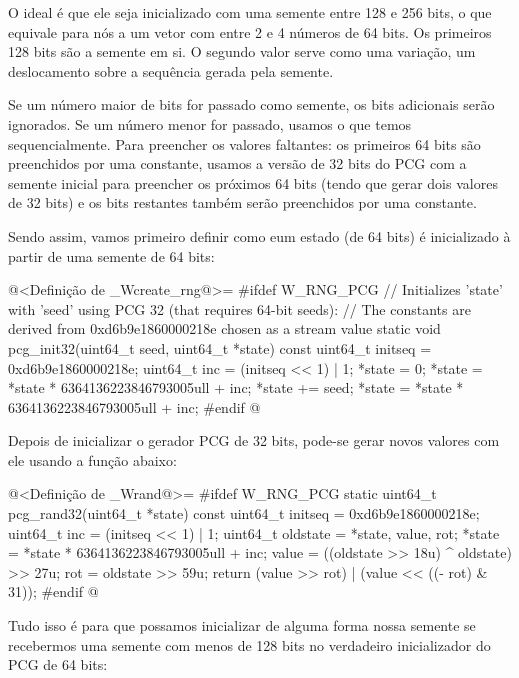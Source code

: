 O ideal é que ele seja inicializado com uma semente entre 128 e 256
bits, o que equivale para nós a um vetor com entre 2 e 4 números de 64
bits. Os primeiros 128 bits são a semente em si. O segundo valor serve
como uma variação, um deslocamento sobre a sequência gerada pela
semente.

Se um número maior de bits for passado como semente, os bits
adicionais serão ignorados. Se um número menor for passado, usamos o
que temos sequencialmente. Para preencher os valores faltantes: os
primeiros 64 bits são preenchidos por uma constante, usamos a versão
de 32 bits do PCG com a semente inicial para preencher os próximos 64
bits (tendo que gerar dois valores de 32 bits) e os bits restantes
também serão preenchidos por uma constante.

Sendo assim, vamos primeiro definir como eum estado (de 64 bits) é
inicializado à partir de uma semente de 64 bits:

\iniciocodigo
@<Definição de \_Wcreate\_rng@>=
#ifdef W_RNG_PCG
// Initializes 'state' with 'seed' using PCG 32 (that requires 64-bit seeds):
// The constants are derived from 0xd6b9e1860000218e chosen as a stream value
static void pcg_init32(uint64_t seed, uint64_t *state){
  const uint64_t initseq = 0xd6b9e1860000218e;
  uint64_t inc = (initseq << 1) | 1;
  *state = 0;
  *state = *state * 6364136223846793005ull + inc;
  *state += seed;
  *state = *state * 6364136223846793005ull + inc;
}
#endif
@
\fimcodigo

Depois de inicializar o gerador PCG de 32 bits, pode-se gerar novos
valores com ele usando a função abaixo:

\iniciocodigo
@<Definição de \_Wrand@>=
#ifdef W_RNG_PCG
static uint64_t pcg_rand32(uint64_t *state){
  const uint64_t initseq = 0xd6b9e1860000218e;
  uint64_t inc = (initseq << 1) | 1;
  uint64_t oldstate = *state, value, rot;
  *state = *state * 6364136223846793005ull + inc;
  value = ((oldstate >> 18u) ^ oldstate) >> 27u;
  rot = oldstate >> 59u;
  return (value >> rot) | (value << ((- rot) & 31));
}
#endif
@
\fimcodigo

Tudo isso é para que possamos inicializar de alguma forma nossa
semente se recebermos uma semente com menos de 128 bits no verdadeiro
inicializador do PCG de 64 bits:

